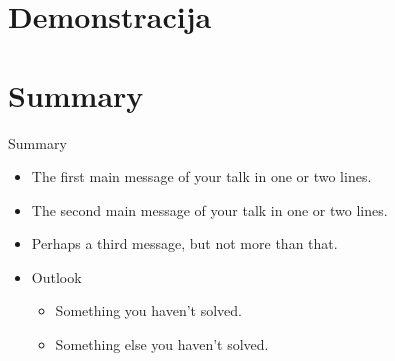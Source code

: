 \documentclass[utf8]{beamer}
\begin{document}
\section{Demonstracija}

\section*{Summary}

\begin{frame}{Summary}
  \begin{itemize}
  \item
    The \alert{first main message} of your talk in one or two lines.
  \item
    The \alert{second main message} of your talk in one or two lines.
  \item
    Perhaps a \alert{third message}, but not more than that.
  \end{itemize}
  
  \begin{itemize}
  \item
    Outlook
    \begin{itemize}
    \item
      Something you haven't solved.
    \item
      Something else you haven't solved.
    \end{itemize}
  \end{itemize}
\end{frame}
\end{document}
